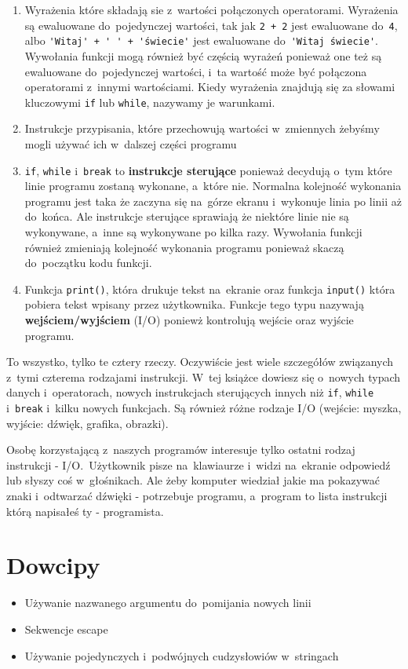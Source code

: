 \documentclass{book}
\newcommand{\btopicscovered}{
	\begin{graybox}
	\begin{itemize}
}
\newcommand{\etopicscovered}{
	\end{itemize}
	\end{graybox}
}
\begin{document}
\begin{enumerate}
\item Wyrażenia które składają sie z~wartości połączonych operatorami. Wyrażenia są ewaluowane do~pojedynczej wartości, tak jak \lstinline{2 + 2} jest ewaluowane do~\lstinline{4}, albo \lstinline{'Witaj' + ' ' + 'świecie'} jest ewaluowane do~\lstinline{'Witaj świecie'}. Wywołania funkcji mogą również być częścią wyrażeń ponieważ one też są ewaluowane do~pojedynczej wartości, i~ta wartość może być połączona operatorami z~innymi wartościami. Kiedy wyrażenia znajdują się za słowami kluczowymi \lstinline{if} lub \lstinline{while}, nazywamy je warunkami.
\item Instrukcje przypisania, które przechowują wartości w~zmiennych żebyśmy mogli używać ich w~dalszej części programu
\item \lstinline{if}, \lstinline{while} i~\lstinline{break} to {\bf instrukcje sterujące} ponieważ decydują o~tym które linie programu zostaną wykonane, a~które nie. Normalna kolejność wykonania programu jest taka że zaczyna się na~górze ekranu i~wykonuje linia po linii aż do~końca. Ale instrukcje sterujące sprawiają że niektóre linie nie są wykonywane, a~inne są wykonywane po kilka razy. Wywołania funkcji również zmieniają kolejność wykonania programu ponieważ skaczą do~początku kodu funkcji.
\item Funkcja \lstinline{print()}, która drukuje tekst na~ekranie oraz funkcja \lstinline{input()} która pobiera tekst wpisany przez użytkownika. Funkcje tego typu nazywają {\bf wejściem/wyjściem} (I/O) poniewż kontrolują wejście oraz wyjście programu.
\end{enumerate}

To wszystko, tylko te cztery rzeczy. Oczywiście jest wiele szczegółów związanych z~tymi czterema rodzajami instrukcji. W~tej książce dowiesz się o~nowych typach danych i~operatorach, nowych instrukcjach sterujących innych niż \lstinline{if}, \lstinline{while} i~\lstinline{break} i~kilku nowych funkcjach. Są również różne rodzaje I/O (wejście: myszka, wyjście: dźwięk, grafika, obrazki).

Osobę korzystającą z~naszych programów interesuje tylko ostatni rodzaj instrukcji - I/O.~Użytkownik pisze na~klawiaurze i~widzi na~ekranie odpowiedź lub słyszy coś w~głośnikach. Ale żeby komputer wiedział jakie ma pokazywać znaki i~odtwarzać dźwięki - potrzebuje programu, a~program to lista instrukcji którą napisałeś ty - programista.

\chapter{Dowcipy}
\btopicscovered
	\item Używanie nazwanego argumentu do~pomijania nowych linii
	\item Sekwencje escape
	\item Używanie pojedynczych i~podwójnych cudzysłowiów w~stringach
\etopicscovered
\end{document}
